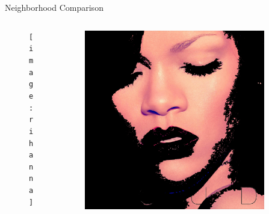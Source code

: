 \documentclass{beamer}
\begin{document}
\begin{frame}{Neighborhood Comparison}
	\begin{columns}
	\begin{column}{5cm}
		\begin{figure}
		\texttt{[image: rihanna]} 
		\end{figure}
	\end{column}
	\begin{column}{5cm}
		\begin{figure}
		\includegraphics[width=0.9\textwidth]{rihanna2} 
		\end{figure}
	\end{column}
	\end{columns}
\end{frame}
\end{document}

